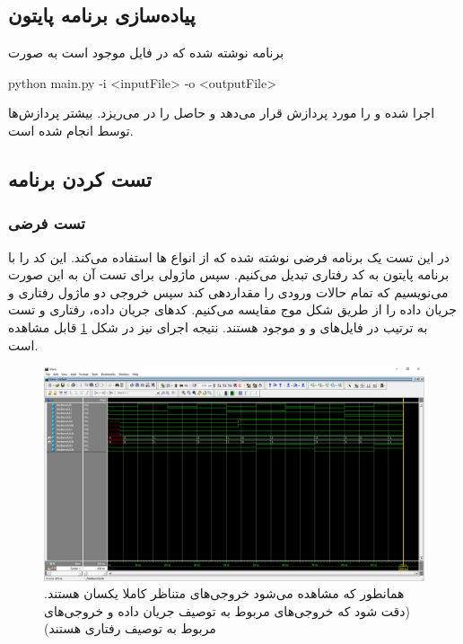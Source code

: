 \documentclass[fleqn]{article}
\begin{document}
\subsection{پیاده‌سازی برنامه پایتون}
برنامه نوشته شده که در فایل
موجود است به صورت
\begin{latin}
	python main.py -i <inputFile> -o <outputFile>
\end{latin}
اجرا شده و
را مورد پردازش قرار می‌دهد و حاصل را در
می‌ریزد. بیشتر پردازش‌ها توسط
انجام شده است.

\subsection{تست کردن برنامه}

\subsubsection{تست فرضی}
در این تست یک برنامه فرضی نوشته شده که از انواع
ها استفاده می‌کند. این کد را با برنامه پایتون به کد رفتاری تبدیل می‌کنیم. سپس ماژولی برای تست آن به این صورت
می‌نویسیم که تمام حالات ورودی را مقداردهی کند سپس خروجی دو ماژول رفتاری و جریان داده را از طریق
شکل موج مقایسه می‌کنیم. کدهای جریان داده، رفتاری و تست به ترتیب در فایل‌های
و
و
موجود هستند. نتیجه اجرای
نیز در شکل
\ref{test1for7}
قابل مشاهده است.

\begin{figure}[!htbp]
	\centering
	\includegraphics[width=\linewidth]{7test1.png}
	\caption{همانطور که مشاهده می‌شود خروجی‌های متناظر کاملا یکسان هستند. (دقت شود که خروجی‌های  مربوط به توصیف جریان داده و خروجی‌های  مربوط به توصیف رفتاری هستند)}
	\label{test1for7}
\end{figure}
\end{document}
